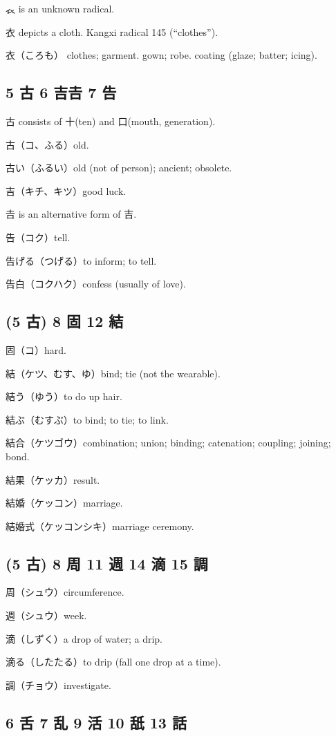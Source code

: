 𧘇 is an unknown radical.

衣 depicts a cloth.
Kangxi radical 145 (``clothes'').

衣（ころも）
clothes;
garment. gown;
robe. coating (glaze; batter; icing).

\subsection{5 古 6 吉𠮷 7 告}

古 consists of 十(ten) and 口(mouth, generation).

古（コ、ふる）old.

古い（ふるい）old (not of person); ancient; obsolete.

吉（キチ、キツ）good luck.

𠮷 is an alternative form of 吉.

告（コク）tell.

告げる（つげる）to inform; to tell.

告白（コクハク）confess (usually of love).

\subsection{(5 古) 8 固 12 結}

固（コ）hard.

結（ケツ、むす、ゆ）bind; tie (not the wearable).

結う（ゆう）to do up hair.

結ぶ（むすぶ）to bind; to tie; to link.

結合（ケツゴウ）combination; union; binding; catenation; coupling; joining; bond.

結果（ケッカ）result.

結婚（ケッコン）marriage.

結婚式（ケッコンシキ）marriage ceremony.

\subsection{(5 古) 8 周 11 週 14 滴 15 調}

周（シュウ）circumference.

週（シュウ）week.

滴（しずく）a drop of water; a drip.

滴る（したたる）to drip (fall one drop at a time).

調（チョウ）investigate.

\subsection{6 舌 7 乱 9 活 10 舐 13 話}


